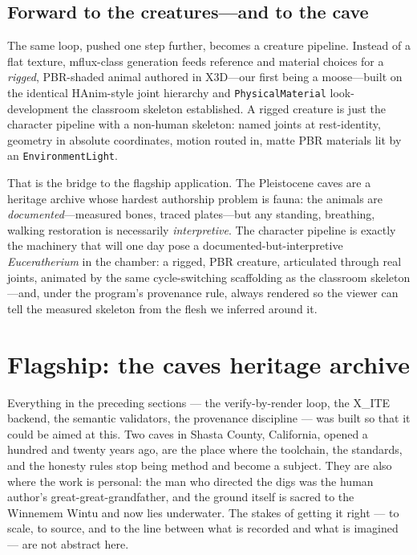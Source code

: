 \documentclass[11pt]{article}
\newcommand{\xite}{X\_ITE}
\begin{document}
\subsection{Forward to the creatures---and to the cave}

The same loop, pushed one step further, becomes a creature pipeline. Instead of a flat texture, mflux-class generation feeds reference and material choices for a \emph{rigged}, PBR-shaded animal authored in X3D---our first being a moose---built on the identical HAnim-style joint hierarchy and \texttt{PhysicalMaterial} look-development the classroom skeleton established. A rigged creature is just the character pipeline with a non-human skeleton: named joints at rest-identity, geometry in absolute coordinates, motion routed in, matte PBR materials lit by an \texttt{EnvironmentLight}.

That is the bridge to the flagship application. The Pleistocene caves are a heritage archive whose hardest authorship problem is fauna: the animals are \emph{documented}---measured bones, traced plates---but any standing, breathing, walking restoration is necessarily \emph{interpretive}. The character pipeline is exactly the machinery that will one day pose a documented-but-interpretive \emph{Euceratherium} in the chamber: a rigged, PBR creature, articulated through real joints, animated by the same cycle-switching scaffolding as the classroom skeleton---and, under the program's provenance rule, always rendered so the viewer can tell the measured skeleton from the flesh we inferred around it.

\section{Flagship: the caves heritage archive}\label{sec:caves}

Everything in the preceding sections --- the verify-by-render loop, the \xite{} backend, the semantic validators, the provenance discipline --- was built so that it could be aimed at this. Two caves in Shasta County, California, opened a hundred and twenty years ago, are the place where the toolchain, the standards, and the honesty rules stop being method and become a subject. They are also where the work is personal: the man who directed the digs was the human author's great-great-grandfather, and the ground itself is sacred to the Winnemem Wintu and now lies underwater. The stakes of getting it right --- to scale, to source, and to the line between what is recorded and what is imagined --- are not abstract here.
\end{document}
